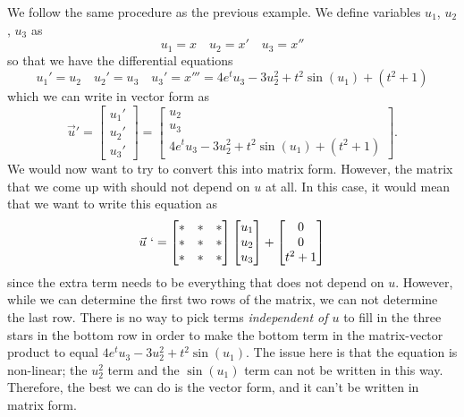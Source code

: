 \begin{exampleSol}
We follow the same procedure as the previous example. We define variables $u_1$, $u_2$, $u_3$ as 
\begin{equation*}
u_1 = x \quad u_2 = x' \quad u_3 = x''
\end{equation*}
so that we have the differential equations
\begin{equation*}
u_1' = u_2 \quad u_2' = u_3 \quad u_3' = x''' = 4e^tu_3 - 3u_2^2 + t^2\sin(u_1) + (t^2 + 1)
\end{equation*}
which we can write in vector form as
\begin{equation*}
\vec{u}' = \begin{bmatrix} u_1'\\ u_2'\\ u_3' \end{bmatrix} = \begin{bmatrix} u_2 \\ u_3 \\  4e^tu_3 - 3u_2^2 + t^2\sin(u_1) + (t^2 + 1) \end{bmatrix}.
\end{equation*}
We would now want to try to convert this into matrix form. However, the matrix that we come up with should not depend on $u$ at all. In this case, it would mean that we want to write this equation as
\begin{equation*}
\vec{u}\ ` = \begin{bmatrix} * & * & * \\ * & * & * \\ * & * & * \end{bmatrix} \begin{bmatrix} u_1 \\ u_2 \\ u_3 \end{bmatrix} + \begin{bmatrix} 0 \\ 0 \\ t^2 + 1 \end{bmatrix} 
\end{equation*}
since the extra term needs to be everything that does not depend on $u$. However, while we can determine the first two rows of the matrix, we can not determine the last row. There is no way to pick terms \emph{independent of $u$} to fill in the three stars in the bottom row in order to make the bottom term in the matrix-vector product to equal $4e^tu_3 - 3u_2^2 + t^2\sin(u_1)$. The issue here is that the equation is non-linear; the $u_2^2$ term and the $\sin(u_1)$ term can not be written in this way. Therefore, the best we can do is the vector form, and it can't be written in matrix form.


\end{exampleSol}
